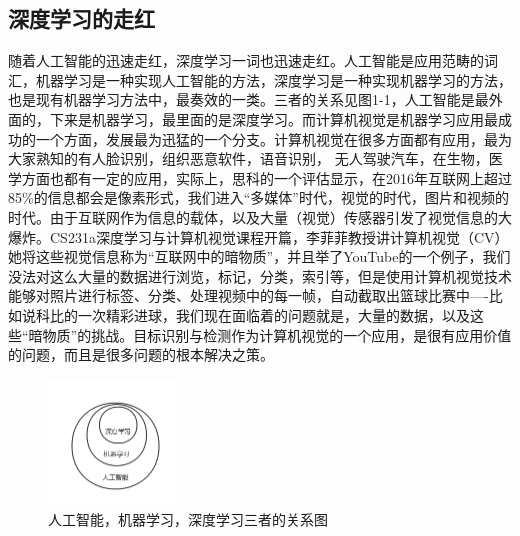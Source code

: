 		\subsection{深度学习的走红}
	随着人工智能的迅速走红，深度学习一词也迅速走红。人工智能是应用范畴的词汇，机器学习是一种实现人工智能的方法，深度学习是一种实现机器学习的方法，也是现有机器学习方法中，最奏效的一类。三者的关系见图1-1，人工智能是最外面的，下来是机器学习，最里面的是深度学习。而计算机视觉是机器学习应用最成功的一个方面，发展最为迅猛的一个分支。计算机视觉在很多方面都有应用，最为大家熟知的有人脸识别，组织恶意软件，语音识别，	无人驾驶汽车，在生物，医学方面也都有一定的应用，实际上，思科的一个评估显示，在2016年互联网上超过85\%的信息都会是像素形式，我们进入“多媒体”时代，视觉的时代，图片和视频的时代。由于互联网作为信息的载体，以及大量（视觉）传感器引发了视觉信息的大爆炸。CS231a深度学习与计算机视觉课程开篇，李菲菲教授讲计算机视觉（CV）她将这些视觉信息称为“互联网中的暗物质”，并且举了YouTube的一个例子，我们没法对这么大量的数据进行浏览，标记，分类，索引等，但是使用计算机视觉技术能够对照片进行标签、分类、处理视频中的每一帧，自动截取出篮球比赛中----比如说科比的一次精彩进球，我们现在面临着的问题就是，大量的数据，以及这些“暗物质”的挑战。目标识别与检测作为计算机视觉的一个应用，是很有应用价值的问题，而且是很多问题的根本解决之策。
	\begin{figure}[!ht]
		\centering
		\includegraphics[width=0.3\textwidth]{figures/1-1}
		\caption{人工智能，机器学习，深度学习三者的关系图}
	\end{figure}
